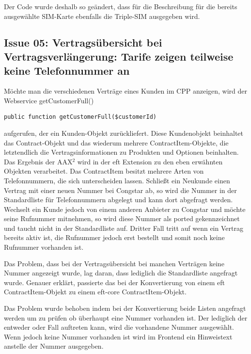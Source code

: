 \documentclass[11pt,a4paper]{article}
\begin{document}
Der Code wurde deshalb so geändert, dass für die Beschreibung für die bereits ausgewählte SIM-Karte ebenfalls die Triple-SIM ausgegeben wird.


\subsection{Issue 05: Vertragsübersicht bei Vertragsverlängerung: Tarife zeigen teilweise keine Telefonnummer an}

Möchte man die verschiedenen Verträge eines Kunden im CPP anzeigen, wird der Webservice getCustomerFull()
\begin{lstlisting}
public function getCustomerFull($customerId)
\end{lstlisting}
aufgerufen, der ein Kunden-Objekt zurückliefert. Diese Kundenobjekt beinhaltet das Contract-Objekt 
und das wiederum mehrere ContractItem-Objekte, die letztendlich die Vertragsinformationen 
zu Produkten und Optionen beinhalten.
Das Ergebnis der AAX$^2$ wird in der eft Extension zu den eben erwähnten Objekten verarbeitet. 
Das ContractItem besitzt mehrere Arten von Telefonnummern, die sich unterscheiden lassen.
Schließt ein Neukunde einen Vertrag mit einer neuen Nummer bei Congstar ab, so wird die Nummer in der Standardliste
für Telefonnummern abgelegt und kann dort abgefragt werden. Wechselt ein Kunde jedoch von einem anderen Anbieter
zu Congstar und möchte seine Rufnummer mitnehmen, so wird diese Nummer als ported gekennzeichnet und taucht nicht 
in der Standardliste auf. Dritter Fall tritt auf wenn ein Vertrag bereits aktiv ist, die Rufnummer jedoch erst bestellt
und somit noch keine Rufnummer vorhanden ist.

Das Problem, dass bei der Vertragsübersicht bei manchen Verträgen keine Nummer angezeigt wurde, lag daran, dass 
lediglich die Standardliste angefragt wurde. Genauer erklärt, passierte das bei der Konvertierung von einem eft ContractItem-Objekt
zu einem eft-core ContractItem-Objekt.

Das Problem wurde behoben indem bei der Konvertierung beide Listen angefragt werden um zu prüfen ob überhaupt eine Nummer vorhanden ist. Der lediglich der entweder oder Fall auftreten kann, wird die vorhandene Nummer ausgewählt. Wenn jedoch keine Nummer vorhanden ist wird im Frontend ein Hinweistext anstelle der Nummer ausgegeben.


\newpage

\listoffigures %


\end{document}
